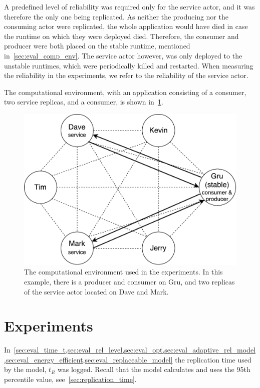 \documentclass{cslthse-msc}
\begin{document}
A predefined level of reliability was required only for the service actor, and it was therefore the only one being replicated. As neither the producing nor the consuming actor were replicated, the whole application would have died in case the runtime on which they were deployed died. Therefore, the consumer and producer were both placed on the stable runtime, mentioned in~\cref{sec:eval_comp_env}. The service actor however, was only deployed to the unstable runtimes, which were periodically killed and restarted. When measuring the reliability in the experiments, we refer to the reliability of the service actor.

The computational environment, with an application consisting of a consumer, two service replicas, and a consumer, is shown in~\cref{fig:evaluation_application}.

\begin{figure}[!hbt]
\centering
\includegraphics[scale=0.5]{images/evaluation_application.pdf} 
\caption[Computational environment in experiments]{The computational environment used in the experiments. In this example, there is a producer and consumer on Gru, and two replicas of the service actor located on Dave and Mark.} \label{fig:evaluation_application}
\end{figure}

\section{Experiments}
In~\cref{sec:eval_time_t,sec:eval_rel_level,sec:eval_opt,sec:eval_adaptive_rel_model,sec:eval_energy_efficient,sec:eval_replaceable_model} the replication time used by the model, $t_R$ was logged. Recall that the model calculates and uses the 95th percentile value, see~\cref{sec:replication_time}.
\end{document}
